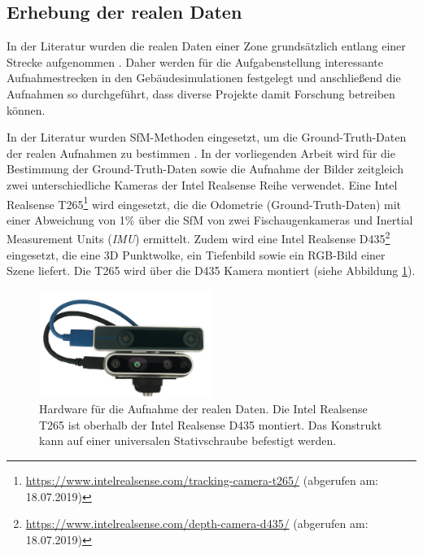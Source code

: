 \newpage
\subsection{Erhebung der realen Daten}
\label{subsec:record_real_data}
In der Literatur wurden die realen Daten einer Zone grundsätzlich entlang einer Strecke aufgenommen \cite{kendallPoseNetConvolutionalNetwork2015, clarkVidLocDeepSpatioTemporal2017, acharyaBIMPoseNetIndoorCamera2019}. Daher werden für die Aufgabenstellung interessante Aufnahmestrecken in den Gebäudesimulationen festgelegt und anschließend die Aufnahmen so durchgeführt, dass diverse Projekte damit Forschung betreiben können. 

In der Literatur wurden SfM-Methoden eingesetzt, um die Ground-Truth-Daten der realen Aufnahmen zu bestimmen \cite{kendallPoseNetConvolutionalNetwork2015, clarkVidLocDeepSpatioTemporal2017, acharyaBIMPoseNetIndoorCamera2019}. 
In der vorliegenden Arbeit wird für die Bestimmung der Ground-Truth-Daten sowie die Aufnahme der Bilder zeitgleich zwei unterschiedliche Kameras der Intel Realsense Reihe verwendet. Eine Intel Realsense T265\footnote{\url{https://www.intelrealsense.com/tracking-camera-t265/} (abgerufen am: 18.07.2019)} wird eingesetzt, die die Odometrie (Ground-Truth-Daten) mit einer Abweichung von 1\%  über die SfM von zwei Fischaugenkameras und Inertial Measurement Units (\textit{IMU}) ermittelt. Zudem wird eine Intel Realsense D435\footnote{ \url{https://www.intelrealsense.com/depth-camera-d435/} (abgerufen am: 18.07.2019)} eingesetzt, die eine 3D Punktwolke, ein Tiefenbild sowie ein RGB-Bild einer Szene liefert. Die T265 wird über die D435 Kamera montiert (siehe Abbildung \ref{fig:t265_d435}). 

\begin{figure}[H]
	\centering
	\includegraphics[width=0.5\textwidth]{images/real_dataset/t265_d435_2.png}
	\caption{Hardware für die Aufnahme der realen Daten. Die Intel Realsense T265 ist oberhalb der Intel Realsense D435 montiert. Das Konstrukt kann auf einer universalen Stativschraube befestigt werden.  }
	\label{fig:t265_d435}
\end{figure}

